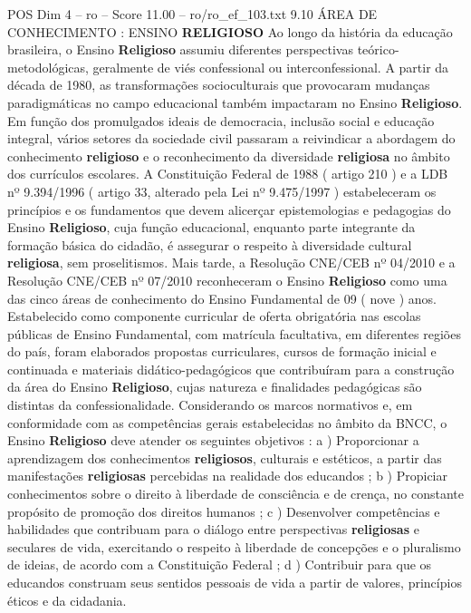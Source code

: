 \begin{textsample}{POS Dim 4 – ro – Score 11.00 – ro/ro\_ef\_103.txt}  \label{ex:f4_pos_214}
9.10 ÁREA DE CONHECIMENTO : ENSINO \textbf{RELIGIOSO} Ao longo da história da educação brasileira, o Ensino \textbf{Religioso} assumiu diferentes perspectivas teórico-metodológicas, geralmente de viés confessional ou interconfessional.
A partir da década de 1980, as transformações socioculturais que provocaram mudanças paradigmáticas no campo educacional também impactaram no Ensino \textbf{Religioso}.
Em função dos promulgados ideais de democracia, inclusão social e educação integral, vários setores da sociedade civil passaram a reivindicar a abordagem do conhecimento \textbf{religioso} e o reconhecimento da diversidade \textbf{religiosa} no âmbito dos currículos escolares.
A Constituição Federal de 1988 ( artigo 210 ) e a LDB nº 9.394/1996 ( artigo 33, alterado pela Lei nº 9.475/1997 ) estabeleceram os princípios e os fundamentos que devem alicerçar epistemologias e pedagogias do Ensino \textbf{Religioso}, cuja função educacional, enquanto parte integrante da formação básica do cidadão, é assegurar o respeito à diversidade cultural \textbf{religiosa}, sem proselitismos.
Mais tarde, a Resolução CNE/CEB nº 04/2010 e a Resolução CNE/CEB nº 07/2010 reconheceram o Ensino \textbf{Religioso} como uma das cinco áreas de conhecimento do Ensino Fundamental de 09 ( nove ) anos.
Estabelecido como componente curricular de oferta obrigatória nas escolas públicas de Ensino Fundamental, com matrícula facultativa, em diferentes regiões do país, foram elaborados propostas curriculares, cursos de formação inicial e continuada e materiais didático-pedagógicos que contribuíram para a construção da área do Ensino \textbf{Religioso}, cujas natureza e finalidades pedagógicas são distintas da confessionalidade.
Considerando os marcos normativos e, em conformidade com as competências gerais estabelecidas no âmbito da BNCC, o Ensino \textbf{Religioso} deve atender os seguintes objetivos : a ) Proporcionar a aprendizagem dos conhecimentos \textbf{religiosos}, culturais e estéticos, a partir das manifestações \textbf{religiosas} percebidas na realidade dos educandos ; b ) Propiciar conhecimentos sobre o direito à liberdade de consciência e de crença, no constante propósito de promoção dos direitos humanos ; c ) Desenvolver competências e habilidades que contribuam para o diálogo entre perspectivas \textbf{religiosas} e seculares de vida, exercitando o respeito à liberdade de concepções e o pluralismo de ideias, de acordo com a Constituição Federal ; d ) Contribuir para que os educandos construam seus sentidos pessoais de vida a partir de valores, princípios éticos e da cidadania.

\end{textsample}
